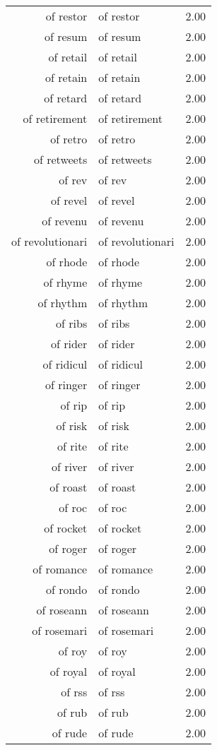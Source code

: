 \begin{table}[ht]
\begin{tabular}{rlr}
  of restor & of restor & 2.00 \\ 
  of resum & of resum & 2.00 \\ 
  of retail & of retail & 2.00 \\ 
  of retain & of retain & 2.00 \\ 
  of retard & of retard & 2.00 \\ 
  of retirement & of retirement & 2.00 \\ 
  of retro & of retro & 2.00 \\ 
  of retweets & of retweets & 2.00 \\ 
  of rev & of rev & 2.00 \\ 
  of revel & of revel & 2.00 \\ 
  of revenu & of revenu & 2.00 \\ 
  of revolutionari & of revolutionari & 2.00 \\ 
  of rhode & of rhode & 2.00 \\ 
  of rhyme & of rhyme & 2.00 \\ 
  of rhythm & of rhythm & 2.00 \\ 
  of ribs & of ribs & 2.00 \\ 
  of rider & of rider & 2.00 \\ 
  of ridicul & of ridicul & 2.00 \\ 
  of ringer & of ringer & 2.00 \\ 
  of rip & of rip & 2.00 \\ 
  of risk & of risk & 2.00 \\ 
  of rite & of rite & 2.00 \\ 
  of river & of river & 2.00 \\ 
  of roast & of roast & 2.00 \\ 
  of roc & of roc & 2.00 \\ 
  of rocket & of rocket & 2.00 \\ 
  of roger & of roger & 2.00 \\ 
  of romance & of romance & 2.00 \\ 
  of rondo & of rondo & 2.00 \\ 
  of roseann & of roseann & 2.00 \\ 
  of rosemari & of rosemari & 2.00 \\ 
  of roy & of roy & 2.00 \\ 
  of royal & of royal & 2.00 \\ 
  of rss & of rss & 2.00 \\ 
  of rub & of rub & 2.00 \\ 
  of rude & of rude & 2.00 \\ 

\end{tabular}
\end{table}
